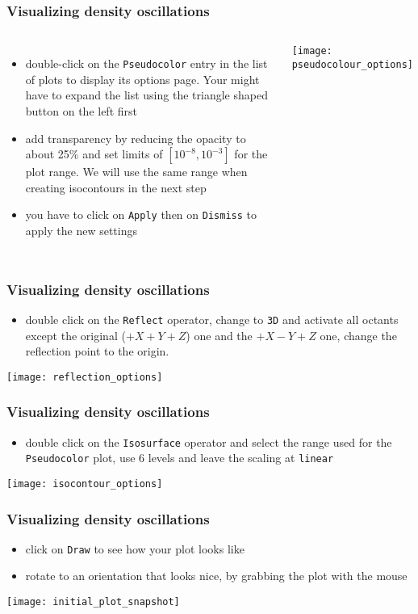 \begin{frame}
\frametitle{Visualizing density oscillations}
\begin{columns}
\column{60mm}
\begin{itemize}
\item double-click on the \texttt{Pseudocolor} entry in the list of plots to display its options page. Your might have to expand the list using the triangle shaped button on the left first
\item add transparency by reducing the opacity to about 25\% and set limits of $[10^{-8},10^{-3}]$ for the plot range. We will use the same range when creating isocontours in the next step
\item you have to click on \texttt{Apply} then on \texttt{Dismiss} to apply the new settings
\end{itemize}
\column{60mm}
\texttt{[image: pseudocolour\_options]}
\end{columns}
\end{frame}

\begin{frame}
\frametitle{Visualizing density oscillations}
\begin{itemize}
\item double click on the \texttt{Reflect} operator, change to \texttt{3D} and activate all octants except the original ($+X+Y+Z$) one and the $+X-Y+Z$ one, change the reflection point to the origin.
\end{itemize}
\begin{center}
\texttt{[image: reflection\_options]}
\end{center}
\end{frame}

\begin{frame}
\frametitle{Visualizing density oscillations}
\begin{itemize}
\item double click on the \texttt{Isosurface} operator and select the range used for the \texttt{Pseudocolor} plot, use $6$ levels and leave the scaling at \texttt{linear}
\end{itemize}
\begin{center}
\texttt{[image: isocontour\_options]}
\end{center}
\end{frame}

\begin{frame}
\frametitle{Visualizing density oscillations}
\begin{itemize}
\item click on \texttt{Draw} to see how your plot looks like
\item rotate to an orientation that looks nice, by grabbing the plot with the mouse
\end{itemize}
\begin{center}
\texttt{[image: initial\_plot\_snapshot]}
\end{center}
\end{frame}

